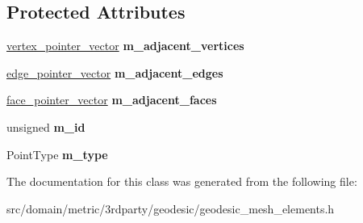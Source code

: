 \subsection*{Protected Attributes}
\begin{DoxyCompactItemize}
\item 
\hypertarget{classgeodesic_1_1_mesh_element_base_af60cffe50087e9b5ea770e7ab8bcaddb}{}\hyperlink{classgeodesic_1_1_simple_vector}{vertex\+\_\+pointer\+\_\+vector} {\bfseries m\+\_\+adjacent\+\_\+vertices}\label{classgeodesic_1_1_mesh_element_base_af60cffe50087e9b5ea770e7ab8bcaddb}

\item 
\hypertarget{classgeodesic_1_1_mesh_element_base_a113429a05d2e89b39ee70b011764ff47}{}\hyperlink{classgeodesic_1_1_simple_vector}{edge\+\_\+pointer\+\_\+vector} {\bfseries m\+\_\+adjacent\+\_\+edges}\label{classgeodesic_1_1_mesh_element_base_a113429a05d2e89b39ee70b011764ff47}

\item 
\hypertarget{classgeodesic_1_1_mesh_element_base_a455d7b86e0a9affa2301ee21b77c52bc}{}\hyperlink{classgeodesic_1_1_simple_vector}{face\+\_\+pointer\+\_\+vector} {\bfseries m\+\_\+adjacent\+\_\+faces}\label{classgeodesic_1_1_mesh_element_base_a455d7b86e0a9affa2301ee21b77c52bc}

\item 
\hypertarget{classgeodesic_1_1_mesh_element_base_a6173e3b72644fc0e736bb2ec74b6034d}{}unsigned {\bfseries m\+\_\+id}\label{classgeodesic_1_1_mesh_element_base_a6173e3b72644fc0e736bb2ec74b6034d}

\item 
\hypertarget{classgeodesic_1_1_mesh_element_base_aaf22414cde7d8103747cd12e2f031bd1}{}Point\+Type {\bfseries m\+\_\+type}\label{classgeodesic_1_1_mesh_element_base_aaf22414cde7d8103747cd12e2f031bd1}

\end{DoxyCompactItemize}


The documentation for this class was generated from the following file\+:\begin{DoxyCompactItemize}
\item 
src/domain/metric/3rdparty/geodesic/geodesic\+\_\+mesh\+\_\+elements.\+h\end{DoxyCompactItemize}
